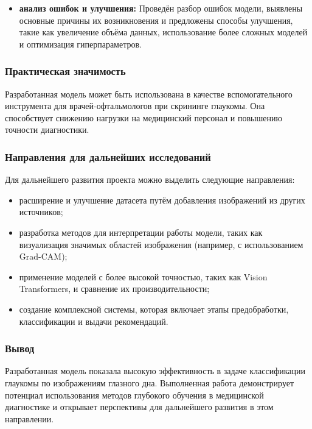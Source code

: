 {\begin{itemize}
        \item \textbf{анализ ошибок и улучшения:} Проведён разбор ошибок модели, выявлены основные причины их возникновения и предложены способы улучшения, такие как увеличение объёма данных, использование более сложных моделей и оптимизация гиперпараметров.

    \end{itemize}

    \subsubsection*{Практическая значимость}

    Разработанная модель может быть использована в качестве вспомогательного инструмента для врачей-офтальмологов при скрининге глаукомы. Она способствует снижению нагрузки на медицинский персонал и повышению точности диагностики. 

    \subsubsection*{Направления для дальнейших исследований}

    Для дальнейшего развития проекта можно выделить следующие направления:
    \begin{itemize}
        \item расширение и улучшение датасета путём добавления изображений из других источников;
        \item разработка методов для интерпретации работы модели, таких как визуализация значимых областей изображения (например, с использованием Grad-CAM);
        \item применение моделей с более высокой точностью, таких как Vision Transformers, и сравнение их производительности;
        \item создание комплексной системы, которая включает этапы предобработки, классификации и выдачи рекомендаций.
    \end{itemize}

    \subsubsection*{Вывод}

    Разработанная модель показала высокую эффективность в задаче классификации глаукомы по изображениям глазного дна. Выполненная работа демонстрирует потенциал использования методов глубокого обучения в медицинской диагностике и открывает перспективы для дальнейшего развития в этом направлении.


}
